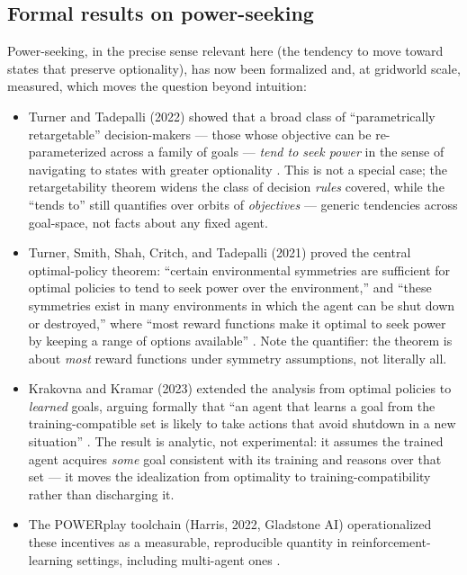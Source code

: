\documentclass[11pt]{article}
\theoremstyle{definition}
\begin{document}
\subsection{Formal results on power-seeking}

Power-seeking, in the precise sense relevant here (the tendency to move toward states that preserve optionality), has now been formalized and, at gridworld scale, measured, which moves the question beyond intuition:

\begin{itemize}[leftmargin=1.5em]
    \item Turner and Tadepalli (2022) showed that a broad class of ``parametrically retargetable'' decision-makers --- those whose objective can be re-parameterized across a family of goals --- \emph{tend to seek power} in the sense of navigating to states with greater optionality \cite{turner2022parametrically}. This is not a special case; the retargetability theorem widens the class of decision \emph{rules} covered, while the ``tends to'' still quantifies over orbits of \emph{objectives} --- generic tendencies across goal-space, not facts about any fixed agent.
    \item Turner, Smith, Shah, Critch, and Tadepalli (2021) proved the central optimal-policy theorem: ``certain environmental symmetries are sufficient for optimal policies to tend to seek power over the environment,'' and ``these symmetries exist in many environments in which the agent can be shut down or destroyed,'' where ``most reward functions make it optimal to seek power by keeping a range of options available'' \cite[p.~1]{turner2021optimal}. Note the quantifier: the theorem is about \emph{most} reward functions under symmetry assumptions, not literally all.
    \item Krakovna and Kramar (2023) extended the analysis from optimal policies to \emph{learned} goals, arguing formally that ``an agent that learns a goal from the training-compatible set is likely to take actions that avoid shutdown in a new situation'' \cite[p.~6]{krakovna2023probable}. The result is analytic, not experimental: it assumes the trained agent acquires \emph{some} goal consistent with its training and reasons over that set --- it moves the idealization from optimality to training-compatibility rather than discharging it.
    \item The POWERplay toolchain (Harris, 2022, Gladstone AI) operationalized these incentives as a measurable, reproducible quantity in reinforcement-learning settings, including multi-agent ones \cite{harris2022powerplay}.
\end{itemize}
\end{document}

